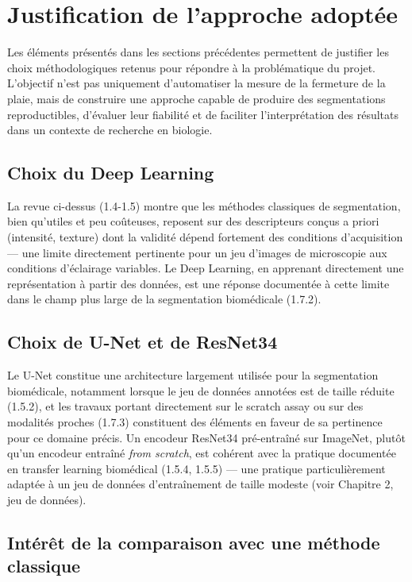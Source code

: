 \documentclass[12pt,a4paper]{report}
\begin{document}
\section{Justification de l'approche adoptée}

Les éléments présentés dans les sections précédentes permettent de justifier les choix méthodologiques retenus pour répondre à la problématique du projet. L'objectif n'est pas uniquement d'automatiser la mesure de la fermeture de la plaie, mais de construire une approche capable de produire des segmentations reproductibles, d'évaluer leur fiabilité et de faciliter l'interprétation des résultats dans un contexte de recherche en biologie.

\subsection{Choix du Deep Learning}

La revue ci-dessus (1.4-1.5) montre que les méthodes classiques de segmentation, bien qu'utiles et peu coûteuses, reposent sur des descripteurs conçus a priori (intensité, texture) dont la validité dépend fortement des conditions d'acquisition — une limite directement pertinente pour un jeu d'images de microscopie aux conditions d'éclairage variables. Le Deep Learning, en apprenant directement une représentation à partir des données, est une réponse documentée à cette limite dans le champ plus large de la segmentation biomédicale (1.7.2).

\subsection{Choix de U-Net et de ResNet34}

Le U-Net constitue une architecture largement utilisée pour la segmentation biomédicale, notamment lorsque le jeu de données annotées est de taille réduite (1.5.2), et les travaux portant directement sur le scratch assay ou sur des modalités proches (1.7.3) constituent des éléments en faveur de sa pertinence pour ce domaine précis. Un encodeur ResNet34 pré-entraîné sur ImageNet, plutôt qu'un encodeur entraîné \textit{from scratch}, est cohérent avec la pratique documentée en transfer learning biomédical (1.5.4, 1.5.5) — une pratique particulièrement adaptée à un jeu de données d'entraînement de taille modeste (voir Chapitre 2, jeu de données).

\subsection{Intérêt de la comparaison avec une méthode classique}
\end{document}

